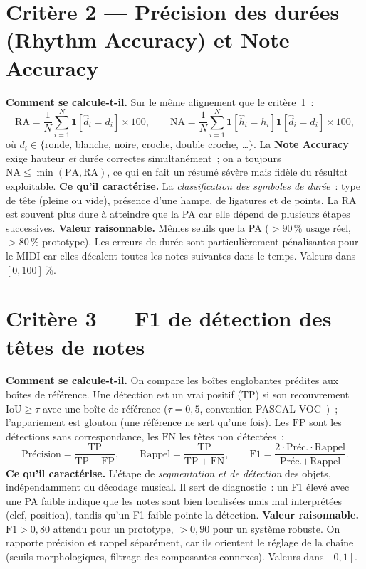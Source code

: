 \documentclass[11pt,a4paper]{article}
\newcommand{\TP}{\mathrm{TP}}
\newcommand{\FP}{\mathrm{FP}}
\newcommand{\FN}{\mathrm{FN}}
\begin{document}
\section{Critère 2 --- Précision des durées (Rhythm Accuracy) et Note Accuracy}
\textbf{Comment se calcule-t-il.} Sur le même alignement que le critère~1~:
\[
\mathrm{RA} = \frac{1}{N}\sum_{i=1}^{N}\mathbf{1}\!\left[\hat d_i = d_i\right]\times 100,
\qquad
\mathrm{NA} = \frac{1}{N}\sum_{i=1}^{N}\mathbf{1}\!\left[\hat h_i = h_i\right]\mathbf{1}\!\left[\hat d_i = d_i\right]\times 100,
\]
où $d_i \in \{$ronde, blanche, noire, croche, double croche, \dots$\}$. La \textbf{Note Accuracy} exige
hauteur \emph{et} durée correctes simultanément~; on a toujours $\mathrm{NA}\le\min(\mathrm{PA},\mathrm{RA})$,
ce qui en fait un résumé sévère mais fidèle du résultat exploitable.
\textbf{Ce qu'il caractérise.} La \emph{classification des symboles de durée}~: type de tête (pleine ou vide),
présence d'une hampe, de ligatures et de points. La RA est souvent plus dure à atteindre que la PA car elle
dépend de plusieurs étapes successives.
\textbf{Valeur raisonnable.} Mêmes seuils que la PA ($>90\,\%$ usage réel, $>80\,\%$ prototype). Les erreurs
de durée sont particulièrement pénalisantes pour le MIDI car elles décalent toutes les notes suivantes dans
le temps. Valeurs dans $[0,100]\,\%$.

\section{Critère 3 --- F1 de détection des têtes de notes}
\textbf{Comment se calcule-t-il.} On compare les boîtes englobantes prédites aux boîtes de référence. Une
détection est un vrai positif ($\TP$) si son recouvrement $\mathrm{IoU}\ge\tau$ avec une boîte de référence
($\tau=0{,}5$, convention PASCAL VOC~\cite{everingham2010})~; l'appariement est glouton (une référence ne sert
qu'une fois). Les $\FP$ sont les détections sans correspondance, les $\FN$ les têtes non détectées~:
\[
\text{Précision}=\frac{\TP}{\TP+\FP},\qquad
\text{Rappel}=\frac{\TP}{\TP+\FN},\qquad
\text{F1}=\frac{2\cdot\text{Préc.}\cdot\text{Rappel}}{\text{Préc.}+\text{Rappel}}.
\]
\textbf{Ce qu'il caractérise.} L'étape de \emph{segmentation et de détection} des objets, indépendamment du
décodage musical. Il sert de diagnostic~: un F1 élevé avec une PA faible indique que les notes sont bien
localisées mais mal interprétées (clef, position), tandis qu'un F1 faible pointe la détection.
\textbf{Valeur raisonnable.} $\text{F1}>0{,}80$ attendu pour un prototype, $>0{,}90$ pour un système robuste.
On rapporte précision et rappel séparément, car ils orientent le réglage de la chaîne (seuils morphologiques,
filtrage des composantes connexes). Valeurs dans $[0,1]$.
\end{document}
